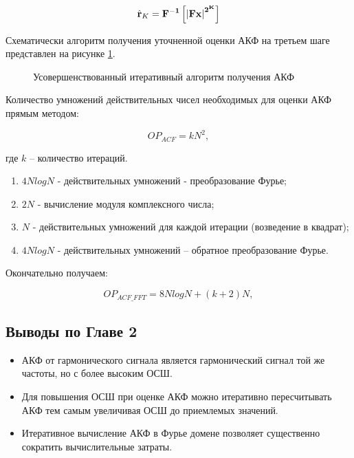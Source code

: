 \begin{center}
\begin{equation}
	\label{eq:akf_3}
	\hat{\bf{r}}_K = \bf{F}^{-1}\left[ \left| \bf{Fx} \right| ^{2^K} \right]
\end{equation}
\end{center}

Схематически алгоритм получения уточненной оценки АКФ на третьем шаге представлен на рисунке \ref{pic:akf_pic}.

\begin{figure}[h]
	\center{}
	\caption{Усовершенствованный итеративный алгоритм получения АКФ}
	\label{pic:akf_pic}
\end{figure}

Количество умножений действительных чисел необходимых для оценки АКФ прямым методом: 
\begin{center}
\begin{equation}
	\label{eq:num_of_op_acf}
	OP_{ACF}=kN^2,
\end{equation}
\end{center}
где ${k}$  – количество итераций.

\begin{enumerate}
\item ${4NlogN}$ - действительных умножений - преобразование Фурье;
\item ${2N}$ - вычисление модуля комплексного числа;
\item ${N}$ - действительных умножений для каждой итерации (возведение в квадрат);
\item ${4NlogN}$ - действительных умножений – обратное преобразование Фурье. 
\end{enumerate}

Окончательно получаем:
\begin{center}
\begin{equation}
	\label{eq:num_of_op_acf}
	OP_{ACF\_FFT}=8NlogN + (k+2)N,
\end{equation}
\end{center}

\subsection{Выводы по Главе 2}

\begin{itemize}
\item АКФ от гармонического сигнала является гармонический сигнал той же частоты, но с более высоким ОСШ.
\item Для повышения ОСШ при оценке АКФ можно итеративно пересчитывать АКФ тем самым увеличивая ОСШ до приемлемых значений.
\item Итеративное вычисление АКФ в Фурье домене позволяет существенно сократить вычислительные затраты.
\end{itemize}


\clearpage
